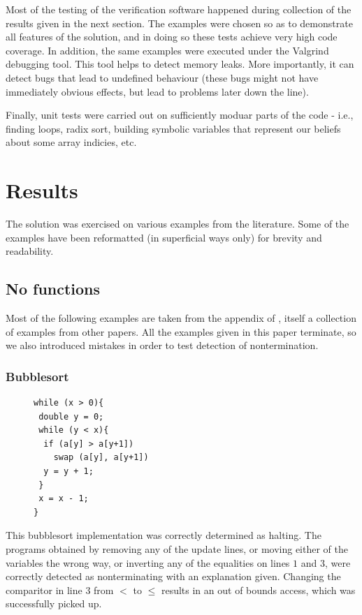 \documentclass[12pt,a4paper]{article}
\begin{document}
Most of the testing of the verification software happened during collection of the results given in the next section. The examples were chosen so as to demonstrate all features of the solution,
and in doing so these tests achieve very high code coverage. In addition, the same examples were executed under the Valgrind debugging tool. This tool helps to detect memory leaks. More importantly, it can detect bugs that lead to undefined behaviour (these bugs might not have immediately obvious effects, but lead to problems later down the line).

Finally, unit tests were carried out on sufficiently moduar parts of the code - i.e., finding loops, radix sort, building symbolic variables that represent our beliefs about some array indicies,
etc.

\newpage
\section{Results}
The solution was exercised on various examples from the literature. Some of the examples have been reformatted (in superficial ways only)
 for brevity and readability.

\subsection{No functions}
Most of the following examples are taken from the appendix of \citep{tra}, itself a collection of examples from other papers.  All the examples given in this paper terminate, so we also introduced mistakes in order to test detection of nontermination.

\subsubsection{Bubblesort}
\begin{figure}
\centering
\begin{lstlisting}[frame=tlrb,language=myLang]
while (x > 0){
 double y = 0;
 while (y < x){
  if (a[y] > a[y+1])
    swap (a[y], a[y+1])
  y = y + 1;
 }
 x = x - 1;
}
\end{lstlisting}
\end{figure}
This bubblesort implementation was correctly determined as halting. The programs obtained by removing any of the update lines, or moving either of the variables the wrong way, or inverting any of the equalities on lines $1$ and $3$, were correctly detected as nonterminating with an explanation given. Changing the comparitor in line $3$ from $<$ to $\leq$ results in an out of bounds access, which was successfully picked up.\\
\end{document}
